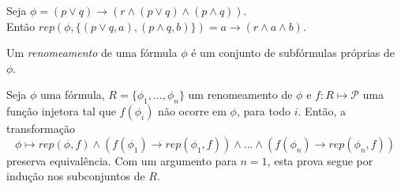 \begin{example}
	Seja $\phi = (p \vee q) \rightarrow (r \wedge (p \vee q) \wedge (p \wedge q))$.\\
	Então $rep(\phi,\{(p \vee q,a),(p \wedge q,b)\}) = a \rightarrow (r \wedge a \wedge b)$.
\end{example}

\begin{definition}
	Um \emph{renomeamento} de uma fórmula $\phi$ é um conjunto de subfórmulas próprias de $\phi$.
\end{definition}

\begin{theorem}
	Seja $\phi$ uma fórmula, $R = \{\phi_1,...,\phi_n\}$ um renomeamento de $\phi$ e $f : R \longmapsto \mathcal{P}$ uma função injetora tal que $f(\phi_i)$ não ocorre em $\phi$, para todo $i$. Então, a transformação $$\phi \longmapsto rep(\phi,f) \wedge (f(\phi_1) \rightarrow rep(\phi_1,f)) \wedge ... \wedge (f(\phi_n) \rightarrow rep(\phi_n,f))$$
    preserva equivalência. Com um argumento para $n=1$, esta prova segue por indução nos subconjuntos de $R$.
\end{theorem}

\begin{example}
    
\end{example}